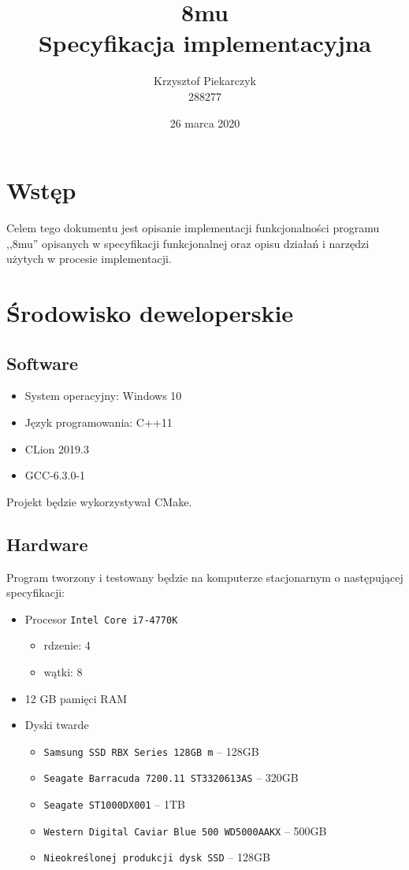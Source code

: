 \documentclass[a4paper,12pt]{report}
\title{8mu \\ \large Specyfikacja implementacyjna}
\author{Krzysztof Piekarczyk \\ \small 288277}
\date{26 marca 2020}
\begin{document}
\maketitle

\tableofcontents
\thispagestyle{fancy}

\chapter{Wstęp}
\thispagestyle{fancy}
Celem tego dokumentu jest opisanie implementacji funkcjonalności programu ,,8mu'' opisanych w specyfikacji funkcjonalnej oraz opisu działań i narzędzi użytych w procesie implementacji.

\chapter{Środowisko deweloperskie}
\thispagestyle{fancy}
\section{Software}
\begin{itemize}
    \item System operacyjny: Windows 10
    \item Język programowania: C++11
    \item CLion 2019.3
    \item GCC-6.3.0-1
\end{itemize}
Projekt będzie wykorzystywał CMake.

\section{Hardware}
Program tworzony i testowany będzie na komputerze stacjonarnym o następującej specyfikacji:
\begin{itemize}
    \item Procesor \verb+Intel Core i7-4770K+
    \begin{itemize}
        \item rdzenie: 4
        \item wątki: 8
    \end{itemize}
    \item 12 GB pamięci RAM
    \item Dyski twarde
    \begin{itemize}
        \item \verb+Samsung SSD RBX Series 128GB m+ -- 128GB
        \item \verb+Seagate Barracuda 7200.11 ST3320613AS+ -- 320GB
        \item \verb+Seagate ST1000DX001+ -- 1TB
        \item \verb+Western Digital Caviar Blue 500 WD5000AAKX+ -- 500GB
        \item \verb+Nieokreślonej produkcji dysk SSD+ -- 128GB
    \end{itemize}
\end{itemize}
\end{document}
